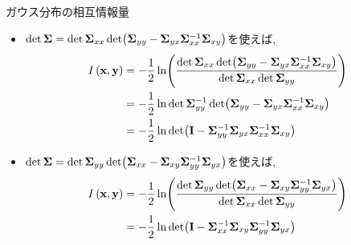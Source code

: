 \documentclass[dvipdfmx,notheorems,t]{beamer}
\begin{document}
\begin{frame}{ガウス分布の相互情報量}
\begin{itemize}
  \item $\det \vb{\Sigma} = \det \vb{\Sigma}_{xx}
  \det(\vb{\Sigma}_{yy} - \vb{\Sigma}_{yx} \vb{\Sigma}_{xx}^{-1} \vb{\Sigma}_{xy})$を使えば,
  \begin{align*}
    I \left( \vb{x}, \vb{y} \right) &= -\frac{1}{2} \ln(\frac{\det \vb{\Sigma}_{xx}
        \det(\vb{\Sigma}_{yy} - \vb{\Sigma}_{yx} \vb{\Sigma}_{xx}^{-1} \vb{\Sigma}_{xy})}{
        \det \vb{\Sigma}_{xx} \det \vb{\Sigma}_{yy}}) \\
      &= -\frac{1}{2} \ln \det \vb{\Sigma}_{yy}^{-1}
        \det(\vb{\Sigma}_{yy} - \vb{\Sigma}_{yx} \vb{\Sigma}_{xx}^{-1} \vb{\Sigma}_{xy}) \\
      &= -\frac{1}{2} \ln \det(\vb{I}
        - \vb{\Sigma}_{yy}^{-1} \vb{\Sigma}_{yx} \vb{\Sigma}_{xx}^{-1} \vb{\Sigma}_{xy})
  \end{align*}
  \item $\det \vb{\Sigma} = \det \vb{\Sigma}_{yy}
  \det(\vb{\Sigma}_{xx} - \vb{\Sigma}_{xy} \vb{\Sigma}_{yy}^{-1} \vb{\Sigma}_{yx})$を使えば,
  \begin{align*}
    I \left( \vb{x}, \vb{y} \right) &= -\frac{1}{2} \ln(\frac{\det \vb{\Sigma}_{yy}
      \det(\vb{\Sigma}_{xx} - \vb{\Sigma}_{xy} \vb{\Sigma}_{yy}^{-1} \vb{\Sigma}_{yx})}{
      \det \vb{\Sigma}_{xx} \det \vb{\Sigma}_{yy}}) \\
      &= -\frac{1}{2} \ln \det(\vb{I}
        - \vb{\Sigma}_{xx}^{-1} \vb{\Sigma}_{xy} \vb{\Sigma}_{yy}^{-1} \vb{\Sigma}_{yx})
  \end{align*}
\end{itemize}
\end{frame}
\end{document}
